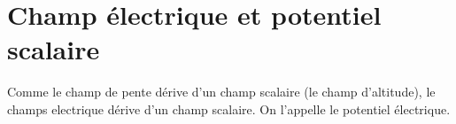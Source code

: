 
\section{Champ électrique et potentiel scalaire}
%
Comme le champ de pente dérive d'un champ scalaire (le champ d'altitude), le champs electrique dérive d'un champ scalaire. On l'appelle le potentiel électrique.

